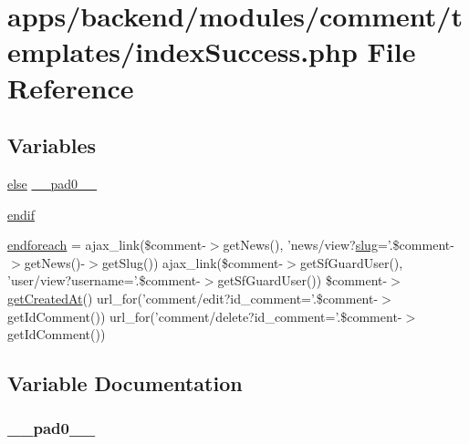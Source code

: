 \hypertarget{backend_2modules_2comment_2templates_2index_success_8php}{\section{apps/backend/modules/comment/templates/index\-Success.php File Reference}
\label{backend_2modules_2comment_2templates_2index_success_8php}
}
\subsection*{Variables}
\begin{DoxyCompactItemize}
\item 
\hyperlink{live_2modules_2team_2templates_2management_success_8php_a0544c3fe466e421738dae463968b70ba}{else} \hyperlink{backend_2modules_2comment_2templates_2index_success_8php_a8e01dcc96c43199448ee66f7c2ae8ea6}{\-\_\-\-\_\-pad0\-\_\-\-\_\-}
\item 
\hyperlink{backend_2modules_2comment_2templates_2index_success_8php_ab4d017bcc79cd2827c3dce8af2570e91}{endif}
\item 
\hyperlink{backend_2modules_2comment_2templates_2index_success_8php_a672d9707ef91db026c210f98cc601123}{endforeach} = ajax\-\_\-link(\$comment-\/$>$get\-News(), 'news/view?\hyperlink{backend_2modules_2ipn_2templates_2view_success_8php_a2b7d6694be020169de3a660b1b93a40d}{slug}='.\$comment-\/$>$get\-News()-\/$>$get\-Slug()) ajax\-\_\-link(\$comment-\/$>$get\-Sf\-Guard\-User(), 'user/view?username='.\$comment-\/$>$get\-Sf\-Guard\-User()) \$comment-\/$>$\hyperlink{live_2modules_2news_2templates_2view_success_8php_a684dd27287fcedcbe91ff8c7cc23f3bb}{get\-Created\-At}() url\-\_\-for('comment/edit?id\-\_\-comment='.\$comment-\/$>$get\-Id\-Comment()) url\-\_\-for('comment/delete?id\-\_\-comment='.\$comment-\/$>$get\-Id\-Comment())
\end{DoxyCompactItemize}


\subsection{Variable Documentation}
\hypertarget{backend_2modules_2comment_2templates_2index_success_8php_a8e01dcc96c43199448ee66f7c2ae8ea6}{
\subsubsection[{\-\_\-\-\_\-pad0\-\_\-\-\_\-}]{ \-\_\-\-\_\-pad0\-\_\-\-\_\-}}\label{backend_2modules_2comment_2templates_2index_success_8php_a8e01dcc96c43199448ee66f7c2ae8ea6}


